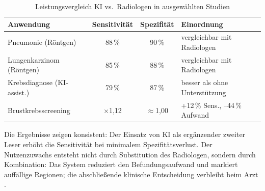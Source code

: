 \begin{table}[htbp]
    \centering
    \caption{Leistungsvergleich KI vs.\ Radiologen in ausgewählten Studien}
    \label{tab:ki_vergleich}
    \begin{tabularx}{\textwidth}{|X|c|c|l|}
        \hline
        \textbf{Anwendung} & \textbf{Sensitivität} & \textbf{Spezifität} & \textbf{Einordnung} \\
        \hline
        Pneumonie (Röntgen)        & 88\,\%            & 90\,\%               & vergleichbar mit Radiologen \\
        Lungenkarzinom (Röntgen)   & 85\,\%            & 88\,\%               & vergleichbar mit Radiologen \\
        Krebsdiagnose (KI-assist.) & 79\,\%            & 87\,\%               & besser als ohne Unterstützung \\
        Brustkrebsscreening        & \(\times\)1{,}12  & \(\approx\)1{,}00    & +12\,\% Sens., --44\,\% Aufwand \\
        \hline
    \end{tabularx}
\end{table}

Die Ergebnisse zeigen konsistent: Der Einsatz von KI als ergänzender zweiter Leser
erhöht die Sensitivität bei minimalem Spezifitätsverlust. Der Nutzenzuwachs entsteht
nicht durch Substitution des Radiologen, sondern durch Kombination: Das System reduziert
den Befundungsaufwand und markiert auffällige Regionen; die abschließende klinische
Entscheidung verbleibt beim Arzt \cite{aiSecondReader2024}.
